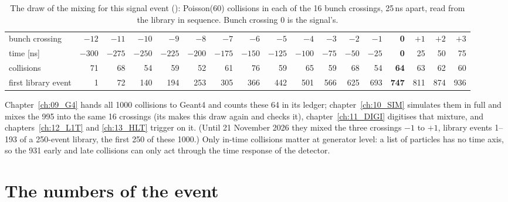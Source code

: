 \begin{table}[htbp]
\centering\footnotesize\setlength{\tabcolsep}{2.6pt}
\caption{The draw of the mixing for this signal event (): Poisson(60) collisions in each
of the 16 bunch crossings, 25\,ns apart, read from the library in sequence. Bunch crossing 0 is the signal's.}
\label{tab:draw}
\begin{tabular}{lrrrrrrrrrrrrrrrr}
\toprule
bunch crossing & $-12$ & $-11$ & $-10$ & $-9$ & $-8$ & $-7$ & $-6$ & $-5$ & $-4$ & $-3$ & $-2$ & $-1$ & \textbf{0} & $+1$ & $+2$ & $+3$ \\
time [ns] & $-300$ & $-275$ & $-250$ & $-225$ & $-200$ & $-175$ & $-150$ & $-125$ & $-100$ & $-75$ & $-50$ & $-25$ & \textbf{0} & 25 & 50 & 75 \\
collisions & 71 & 68 & 54 & 59 & 52 & 61 & 76 & 59 & 65 & 59 & 68 & 54 & \textbf{64} & 63 & 62 & 60 \\
first library event & 1 & 72 & 140 & 194 & 253 & 305 & 366 & 442 & 501 & 566 & 625 & 693 & \textbf{747} & 811 & 874 & 936 \\
\bottomrule
\end{tabular}
\end{table}

Chapter~\ref{ch:09_G4} hands all 1000 collisions to Geant4 and counts these 64 in its ledger;
chapter~\ref{ch:10_SIM} simulates them in full and mixes the 995 into the same 16 crossings (its
 makes this draw again and checks it), chapter~\ref{ch:11_DIGI} digitises that mixture, and
chapters~\ref{ch:12_L1T} and \ref{ch:13_HLT} trigger on it. (Until 21 November 2026 they mixed the three crossings
$-1$ to $+1$, library events 1--193 of a 250-event library, the first 250 of these 1000.) Only in-time
collisions matter at generator level: a list of particles has no time axis, so the 931 early and late
collisions can only act through the time response of the detector.

\section{The numbers of the event}
\label{sec:08_numbers}

